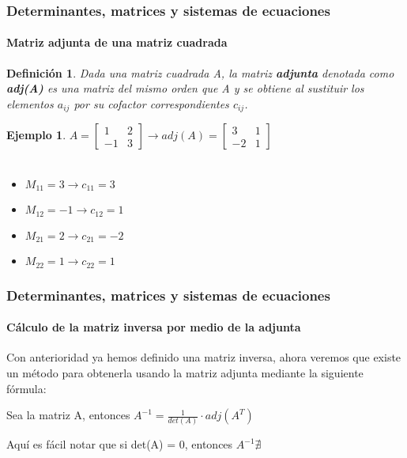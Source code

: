\documentclass[11pt]{beamer}
\newtheorem{defi}{Definición}
\newtheorem{ejem}{Ejemplo}
\begin{document}
\begin{frame}
\frametitle{Determinantes, matrices y sistemas de ecuaciones}
\framesubtitle{Matriz adjunta de una matriz cuadrada}
\begin{defi}
Dada una matriz cuadrada A, la matriz \textbf{adjunta} denotada como \textbf{adj(A)} es una matriz del mismo orden que A y se obtiene al sustituir los elementos $a_{ij}$ por su cofactor correspondientes $c_{ij}$.
\end{defi}
\begin{ejem}
${\displaystyle A = {\begin{bmatrix}1&2\\-1&3\end{bmatrix}}} \rightarrow 
{\displaystyle adj(A) = {\begin{bmatrix}3&1\\-2&1\end{bmatrix}}}$\\ \hspace{0cm} \\
\begin{itemize}
\item $M_{11} = 3 \rightarrow c_{11} = 3$
\item $M_{12} = -1 \rightarrow c_{12} = 1$
\item $M_{21} = 2 \rightarrow c_{21} = -2$
\item $M_{22} = 1 \rightarrow c_{22} = 1$
\end{itemize}
\end{ejem}
\end{frame}

\begin{frame}
\frametitle{Determinantes, matrices y sistemas de ecuaciones}
\framesubtitle{Cálculo de la matriz inversa por medio de la adjunta}
Con anterioridad ya hemos definido una matriz inversa, ahora veremos que existe un método para obtenerla usando la matriz adjunta mediante la siguiente fórmula:\\
\begin{center}
Sea la matriz A, entonces $A^{-1} = \frac{1}{det(A)}\cdot adj(A^T)$
\end{center}
Aquí es fácil notar que si det(A) = 0, entonces $A^{-1} \nexists$
\end{frame}
\end{document}
